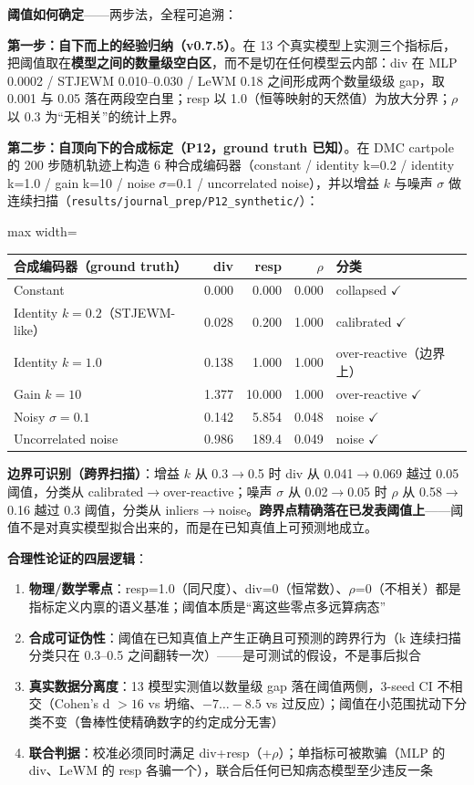 \documentclass[11pt,a4paper]{article}
\begin{document}
\textbf{阈值如何确定}——两步法，全程可追溯：

\textbf{第一步：自下而上的经验归纳（v0.7.5）}。在 13 个真实模型上实测三个指标后，把阈值取在\textbf{模型之间的数量级空白区}，而不是切在任何模型云内部：div 在 MLP 0.0002 / STJEWM 0.010--0.030 / LeWM 0.18 之间形成两个数量级级 gap，取 0.001 与 0.05 落在两段空白里；resp 以 1.0（恒等映射的天然值）为放大分界；$\rho$ 以 0.3 为``无相关''的统计上界。

\textbf{第二步：自顶向下的合成标定（P12，ground truth 已知）}。在 DMC cartpole 的 200 步随机轨迹上构造 6 种合成编码器（constant / identity k=0.2 / identity k=1.0 / gain k=10 / noise $\sigma$=0.1 / uncorrelated noise），并以增益 $k$ 与噪声 $\sigma$ 做连续扫描（\texttt{results/journal\_prep/P12\_synthetic/}）：

\begingroup\scriptsize
\begin{adjustbox}{max width=\textwidth}
\begin{tabular}{lrrrl}
\toprule
\textbf{合成编码器（ground truth）} & \textbf{div} & \textbf{resp} & \textbf{$\rho$} & \textbf{分类} \\
\midrule
Constant & 0.000 & 0.000 & 0.000 & collapsed $\checkmark$ \\
Identity $k=0.2$（STJEWM-like） & 0.028 & 0.200 & 1.000 & calibrated $\checkmark$ \\
Identity $k=1.0$ & 0.138 & 1.000 & 1.000 & over-reactive（边界上） \\
Gain $k=10$ & 1.377 & 10.000 & 1.000 & over-reactive $\checkmark$ \\
Noisy $\sigma=0.1$ & 0.142 & 5.854 & 0.048 & noise $\checkmark$ \\
Uncorrelated noise & 0.986 & 189.4 & 0.049 & noise $\checkmark$ \\
\bottomrule
\end{tabular}
\end{adjustbox}
\endgroup

\textbf{边界可识别（跨界扫描）}：增益 $k$ 从 0.3$\to$0.5 时 div 从 0.041$\to$0.069 越过 0.05 阈值，分类从 calibrated$\to$over-reactive；噪声 $\sigma$ 从 0.02$\to$0.05 时 $\rho$ 从 0.58$\to$0.16 越过 0.3 阈值，分类从 inliers$\to$noise。\textbf{跨界点精确落在已发表阈值上}——阈值不是对真实模型拟合出来的，而是在已知真值上可预测地成立。

\textbf{合理性论证的四层逻辑}：
\begin{enumerate}[leftmargin=2em]
    \item \textbf{物理/数学零点}：resp=1.0（同尺度）、div=0（恒常数）、$\rho$=0（不相关）都是指标定义内禀的语义基准；阈值本质是``离这些零点多远算病态''
    \item \textbf{合成可证伪性}：阈值在已知真值上产生正确且可预测的跨界行为（k 连续扫描分类只在 0.3--0.5 之间翻转一次）——是可测试的假设，不是事后拟合
    \item \textbf{真实数据分离度}：13 模型实测值以数量级 gap 落在阈值两侧，3-seed CI 不相交（Cohen's d $> 16$ vs 坍缩、$-7\ldots-8.5$ vs 过反应）；阈值在小范围扰动下分类不变（鲁棒性使精确数字的约定成分无害）
    \item \textbf{联合判据}：校准必须同时满足 div+resp（+$\rho$）；单指标可被欺骗（MLP 的 div、LeWM 的 resp 各骗一个），联合后任何已知病态模型至少违反一条
\end{enumerate}
\end{document}
